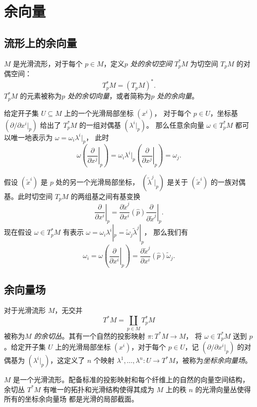 \documentclass[fontset=none]{Notes}
\begin{document}
\section{余向量}

\subsection{流形上的余向量}

$M$ 是光滑流形，对于每个 $p\in M$，定义\emph{$p$ 处的余切空间}
$T_p^*M$ 为切空间 $T_pM$ 的对偶空间：
\[
  T_p^*M=(T_pM)^*.  
\]
$T_p^*M$ 的元素被称为\emph{$p$ 处的余切向量}，或者简称为\emph{$p$ 处的余向量}。

给定开子集 $U\subseteq M$ 上的一个光滑局部坐标 $\left(x^i\right)$，
对于每个 $p\in U$，坐标基 $\left(\partial /\partial x^i|_p\right)$
给出了 $T_p^*M$ 的一组对偶基 $\left(\lambda^i|_p\right)$。
那么任意余向量 $\omega\in T_p^*M$ 都可以唯一地表示为 $\omega=\omega_i\lambda^i|_p$，
此时
\[
  \omega\left(\left.\frac{\partial}{\partial x^j}\right|_p\right)=\omega_i  
  \lambda^i|_p\left(\left.\frac{\partial}{\partial x^j}\right|_p\right)
  =\omega_j.
\]

假设 $\left(\tilde{x}^i\right)$ 是 $p$ 处的另一个光滑局部坐标，
$\left(\tilde{\lambda}^j|_p\right)$ 是关于 $\left(\tilde{x}^i\right)$
的一族对偶基。此时切空间 $T_pM$ 的两组基之间有基变换
\[
  \left.\frac{\partial}{\partial x^i}\right|_p=
  \frac{\partial\tilde x^j}{\partial x^i}(\hat p)
  \left.\frac{\partial}{\partial \tilde x^j}\right|_p.
\]
现在假设 $\omega\in T_p^*M$ 有表示 
$\omega=\omega_i\lambda^i|_p=\tilde{\omega}_j\tilde{\lambda}^j|_p$，
那么我们有
\[
  \omega_i=\omega\left(
    \left.\frac{\partial}{\partial x^i}\right|_p
  \right)=
  \frac{\partial\tilde x^j}{\partial x^i}(\hat p)
  \tilde{\omega}_j.
\]


\subsection{余向量场}

对于光滑流形 $M$，无交并
\[
  T^*M=\coprod_{p\in M}T_p^*M  
\]
被称为\emph{$M$ 的余切丛}。其有一个自然的投影映射 $\pi:T^*M\to M$，
将 $\omega\in T_p^*M$ 送到 $p$。给定开子集 $U$ 上的光滑局部坐标
$\left(x^i\right)$，对于每个 $p\in U$，记 $\left(\partial/\partial x^i|_p\right)$
的对偶基为 $\left(\lambda^i|_p\right)$，这定义了 $n$ 个映射
$\lambda^1,\dots,\lambda^n:U\to T^*M$，被称为\emph{坐标余向量场}。

\begin{proposition}[余切丛作为向量丛]
  $M$ 是一个光滑流形。配备标准的投影映射和每个纤维上的自然的向量空间结构，
  余切丛 $T^*M$ 有唯一的拓扑和光滑结构使得其成为 $M$ 
  上的秩 $n$ 的光滑向量丛使得所有的坐标余向量场
  都是光滑的局部截面。
\end{proposition}
\end{document}
